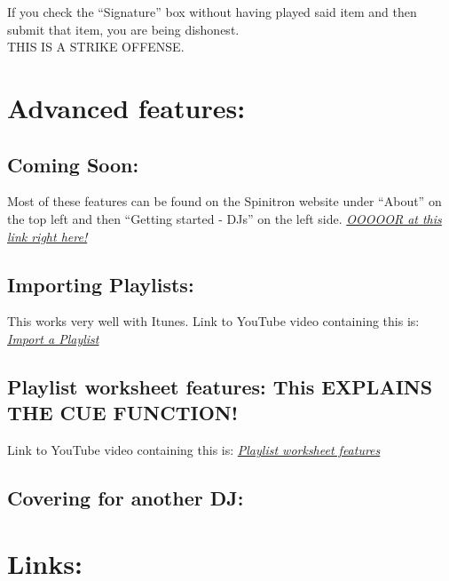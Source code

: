 \documentclass[12pt]{article}
\begin{document}
\hrulefill

If you check the ``Signature'' box without having played said item and then submit that item, you are being dishonest. 
\\
THIS IS A STRIKE OFFENSE.

\hrulefill








\section{Advanced features:}

\subsection{Coming Soon:}

Most of these features can be found on the Spinitron website under ``About'' on the top left and then ``Getting started - DJs'' on the left side. 
\href{https://spinitron.com/about/help/get-started-dj.html}{{\it OOOOOR at this link right here!}}

\subsection{Importing Playlists:}

This works very well with Itunes.
Link to YouTube video containing this is: 
\href{https://www.youtube.com/watch?v=aN8mCR1NiHc}{{\it Import a Playlist}}

\subsection{Playlist worksheet features: This EXPLAINS THE CUE FUNCTION!}

Link to YouTube video containing this is:
\href{https://www.youtube.com/watch?v=xj7dVbhUXFM}{{\it Playlist worksheet features}}

\subsection{Covering for another DJ:}

\newpage

\section{Links:}
\end{document}
